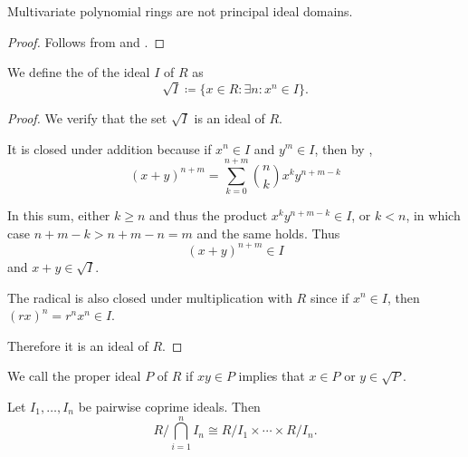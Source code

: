 \begin{corollary}\label{thm:multivariate_polynomial_rings_are_not_pid}
  Multivariate polynomial rings are not principal ideal domains.
\end{corollary}
\begin{proof}
  Follows from  and .
\end{proof}

\begin{definition}\label{def:radical_ideal}\cite[15]{Коцев2016}
  We define the  of the ideal \( I \) of \( R \) as
  \begin{equation*}
    \sqrt I \coloneqq \{ x \in R \colon \exists n: x^n \in I \}.
  \end{equation*}
\end{definition}
\begin{proof}
  We verify that the set \( \sqrt I \) is an ideal of \( R \).

  It is closed under addition because if \( x^n \in I \) and \( y^m \in I \), then by ,
  \begin{equation*}
    (x + y)^{n+m}
    =
    \sum_{k=0}^{n+m} \binom n k x^k y^{n+m-k}
  \end{equation*}

  In this sum, either \( k \geq n \) and thus the product \( x^k y^{n+m-k} \in I \), or \( k < n \), in which case \( n + m - k > n + m - n = m \) and the same holds. Thus
  \begin{equation*}
    (x + y)^{n+m} \in I
  \end{equation*}
  and \( x + y \in \sqrt I \).

  The radical is also closed under multiplication with \( R \) since if \( x^n \in I \), then \( (rx)^n = r^n x^n \in I \).

  Therefore it is an ideal of \( R \).
\end{proof}

\begin{definition}\label{def:primary_ring_ideal}\cite[74]{Коцев2016}
  We call the proper ideal \( P \) of \( R \)  if \( xy \in P \) implies that \( x \in P \) or \( y \in \sqrt P \).
\end{definition}

\begin{theorem}\label{thm:chinese_remained_theorem}\cite[theorem 8.27]{Knapp2016BAlg}
  Let \( I_1, \ldots, I_n \) be pairwise coprime ideals. Then
  \begin{equation*}
    R / \bigcap_{i=1}^n I_n \cong R / I_1 \times \cdots \times R / I_n.
  \end{equation*}
\end{theorem}
